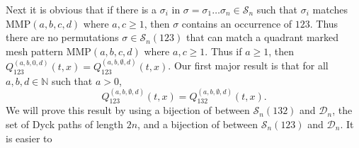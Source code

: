 \documentclass[
final,nomarks
]{dmtcs-episciences}
\newcommand{\Sn}[1]{\mathcal{S}_{#1}}
\newcommand{\MMP}{\mathrm{MMP}}
\begin{document}
Next it is obvious that if there is a \begin{math}\sigma_i\end{math} in \begin{math}\sigma =\sigma_1 \ldots \sigma_n \in \Sn{n}\end{math} such 
that \begin{math}\sigma_i\end{math} matches \begin{math}\MMP(a,b,c,d)\end{math} where \begin{math}a,c \geq 1\end{math}, then \begin{math}\sigma\end{math} contains an occurrence of \begin{math}123\end{math}. 
Thus there are no permutations \begin{math}\sigma \in \Sn{n}(123)\end{math} that can 
match a quadrant marked mesh pattern \begin{math}\MMP(a,b,c,d)\end{math} where \begin{math}a,c \geq 1\end{math}.  Thus if 
\begin{math}a \geq 1\end{math}, then \begin{math}Q_{123}^{(a, b, 0, d)}(t,x) = Q_{123}^{(a, b, \emptyset, d)}(t,x)\end{math}.
Our first major result is that for all \begin{math}a,b,d \in \mathbb{N}\end{math} such that \begin{math}a > 0\end{math},  
\begin{equation}\label{reduce1}
Q_{123}^{(a,b, \emptyset, d)}(t,x) = Q_{132}^{(a,b, \emptyset, d)}(t,x).
\end{equation}
We will prove this result by using a bijection of \cite{Kr} between \begin{math}\Sn{n}(132)\end{math} and \begin{math}\mathcal{D}_n\end{math}, the set of Dyck paths of length \begin{math}2n\end{math}, and a bijection of \cite{EliDeu} between \begin{math}\Sn{n}(123)\end{math} and \begin{math}\mathcal{D}_n\end{math}. It is easier to 
\end{document}
